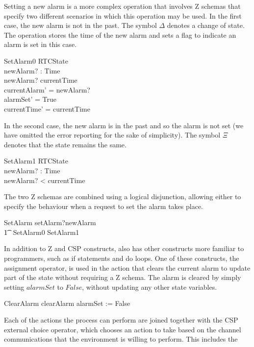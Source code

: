 \documentclass[a4paper,10pt]{report}
\begin{document}
%
Setting a new alarm is a more complex operation that involves Z schemas that
specify two different scenarios in which this operation may be used. In the
first case, the new alarm is not in the past. The symbol $\Delta$ denotes a
change of state. The operation stores the time of the new alarm and sets a flag
to indicate an alarm is set in this case.
%
\begin{schema}{SetAlarm0}
  \Delta RTCState \\
  newAlarm? : Time \\
\where
  newAlarm? \geq currentTime \\
  currentAlarm' = newAlarm? \\
  alarmSet' = True \\
  currentTime' = currentTime \\
\end{schema}
%
In the second case, the new alarm is in the past and so the alarm is not set (we
have omitted the error reporting for the sake of simplicity). The symbol $\Xi$
denotes that the state remains the same.
%
\begin{schema}{SetAlarm1}
  \Xi RTCState \\
  newAlarm? : Time \\
\where
  newAlarm? < currentTime \\
\end{schema}
%
The two Z schemas are combined using a logical disjunction, allowing either to
specify the behaviour when a request to set the alarm takes place.
%
\begin{circusaction}
  SetAlarm \circdef setAlarm?newAlarm \\
  \t1 \then\ \lschexpract SetAlarm0 \lor SetAlarm1 \rschexpract
\end{circusaction}
%
In addition to Z and CSP constructs, \Circus{} also has other constructs more
familiar to programmers, such as if statements and do loops. One of these
constructs, the assignment operator, is used in the action that clears the
current alarm to update part of the state without requiring a Z schema.  The
alarm is cleared by simply setting $alarmSet$ to $False$, without updating any
other state variables.
%
\begin{circusaction}
  ClearAlarm \circdef clearAlarm \then alarmSet := False
\end{circusaction}
%
Each of the actions the process can perform are joined together with the CSP
external choice operator, which chooses an action to take based on the channel
communications that the environment is willing to perform. This includes the
\end{document}
